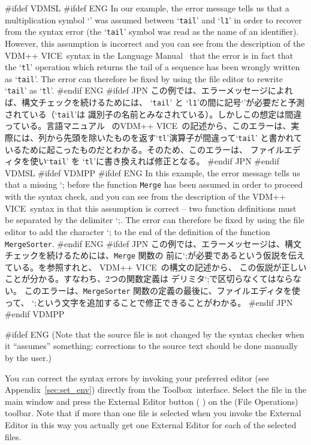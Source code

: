 \documentclass[\pformat,12pt]{article}
\newcommand{\vdmslpp}{VDM-SL}
\newcommand{\Toolbox}{Toolbox}
\newcommand{\vdmslpp}{VDM++}
\newcommand{\Toolbox}{Toolbox}
\renewcommand{\vdmslpp}{VDM++ VICE}
\newcommand{\Lit}[1]{`#1\Quote}
\newcommand{\aaa}{\tt }
\newcommand{\guicmd}[1]{{\sf #1}}
\newcommand{\guicmd}[1]{{\gt #1}}
\begin{document}
#ifdef VDMSL
#ifdef ENG
In our example, the error message tells us that a multiplication symbol
`{\tt*}' was assumed between `{\tt tail}' and `{\tt l1}' in order to
recover from the syntax error (the `{\tt tail}' symbol was read as the
name of an identifier). However, this assumption is incorrect and  you
can see from the  description of the \vdmslpp\ syntax in the Language
Manual~\cite{LangMan-SCSK} that the error is in fact that the `{\tt tl}'
operation which returns the tail of a sequence has been wrongly
written as `{\tt tail}'. The error can therefore be fixed by using the
file editor to rewrite `{\tt tail}' as `{\tt tl}'.
#endif ENG
#ifdef JPN
この例では、エラーメッセージによれば、構文チェックを続けるためには、
`{\tt tail}' と `{\tt l1}'の間に記号`{\tt*}'が必要だと予測されている（`{\tt tail}'は
識別子の名前とみなされている）。しかしこの想定は間違っている。言語マニュアル~\cite{LangMan-SCSK} 
の\vdmslpp\ の記述から、このエラーは、実際には、列から先頭を除いたものを返す`{\tt tl}'演算子が間違って`{\tt tail}'
と書かれているために起こったものだとわかる。そのため、このエラーは、
ファイルエディタを使い`{\tt tail}' を `{\tt tl}'に書き換えれば修正となる。
#endif JPN
#endif VDMSL
#ifdef VDMPP
#ifdef ENG
In this example, the error message tells us that a missing \Lit{;}
before the function {\aaa Merge} has been assumed in order to proceed
with the syntax check, and you can see from the  description of the
\vdmslpp\ syntax in \cite{LangManPP-SCSK} that this assumption is correct
-- two function definitions must be separated by the delimiter
\Lit{;}. The error can therefore be fixed by using the file editor to
add the character \Lit{;} to the end of the definition of the function
{\aaa MergeSorter}.
#endif ENG
#ifdef JPN
この例では、エラーメッセージは、構文チェックを続けるためには、{\aaa Merge} 関数の
前に\Lit{;}が必要であるという仮説を伝えている。\cite{LangManPP-SCSK}を参照すれと、
\vdmslpp\  の構文の記述から、 この仮説が正しいことが分かる。すなわち、2つの関数定義は
デリミタ\Lit{;}で区切らなくてはならない。
このエラーは、{\aaa MergeSorter} 関数の定義の最後に、ファイルエディタを使って、
\Lit{;}という文字を追加することで修正できることがわかる。
#endif JPN
#endif VDMPP

#ifdef ENG
(Note that the source file is not changed by the syntax checker when
it ``assumes'' something: corrections to the source text should be
done manually by the user.)

You can correct the syntax errors by invoking your preferred editor
(see Appendix~\ref{sec:set_env}) directly from the \Toolbox\
interface. Select the file  in the main window and 
press the \guicmd{External Editor}\index{External Editor} button (%
) 
on the (\guicmd{File Operations}) toolbar. Note that if more than
one file is selected when you invoke the \guicmd{External Editor} in
this way you actually get one \guicmd{External Editor} for each of the
selected files.
\end{document}
